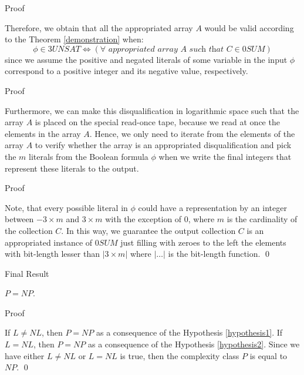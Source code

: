 \documentclass[11pt]{beamer}
\begin{document}
\begin{frame}{Proof}

Therefore, we obtain that all the appropriated array $A$ would be valid according to the Theorem \ref{demonstration} when:
\[\phi \in 3UNSAT \Leftrightarrow (\forall \textit{ appropriated array } A \textit{ such that } C \in 0SUM)\]
since we assume the positive and negated literals of some variable in the input $\phi$ correspond to a positive integer and its negative value, respectively.

\end{frame}

\begin{frame}{Proof}

Furthermore, we can make this disqualification in logarithmic space such that the array $A$ is placed on the special read-once tape, because we read at once the elements in the array $A$. Hence, we only need to iterate from the elements of the array $A$ to verify whether the array is an appropriated disqualification and pick the $m$ literals from the Boolean formula $\phi$ when we write the final integers that represent these literals to the output.

\end{frame}

\begin{frame}{Proof}

Note, that every possible literal in $\phi$ could have a representation by an integer between $-3 \times m$ and $3 \times m$ with the exception of $0$, where $m$ is the cardinality of the collection $C$. In this way, we guarantee the output collection $C$ is an appropriated instance of $0SUM$ just filling with zeroes to the left the elements with bit-length lesser than $|3 \times m|$ where $|\ldots|$ is the bit-length function. \qed

\end{frame}

\begin{frame}{Final Result}

\begin{theorem}
$P = NP$.
\end{theorem}

\end{frame}

\begin{frame}{Proof}

If $L \neq NL$, then $P = NP$ as a consequence of the Hypothesis \ref{hypothesis1}. If $L = NL$, then $P = NP$ as a consequence of the Hypothesis \ref{hypothesis2}. Since we have either $L \neq NL$ or $L = NL$ is true, then the complexity class $P$ is equal to $NP$. \qed

\end{frame}
\end{document}
